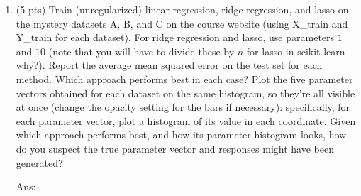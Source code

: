 \documentclass[10pt,letter,notitlepage]{article}
\newcommand{\ans}[1]{{\color{orange}\textsf{Ans}: #1}}
\newcounter{exercise}
\begin{document}
\begin{exercise}
\begin{enumerate}
    \ans{}

For the next part, you may use the Python package scikit-learn.

\item (5 pts) Train (unregularized) linear regression, ridge regression, and lasso on the mystery datasets A, B, and C on the course website (using X\_train and Y\_train for each dataset).
  For ridge regression and lasso, use parameters $1$ and $10$ (note that you will have to divide these by $n$ for lasso in scikit-learn -- why?).
  Report the average mean squared error on the test set for each method.
  Which approach performs best in each case?
    Plot the five parameter vectors obtained for each dataset on the same histogram, so they're all visible at once (change the opacity setting for the bars if necessary): specifically, for each parameter vector, plot a histogram of its value in each coordinate.
    Given which approach performs best, and how its parameter histogram looks, how do you suspect the true parameter vector and responses might have been generated?

  \ans{}
\end{enumerate}
\end{exercise}
\end{document}
